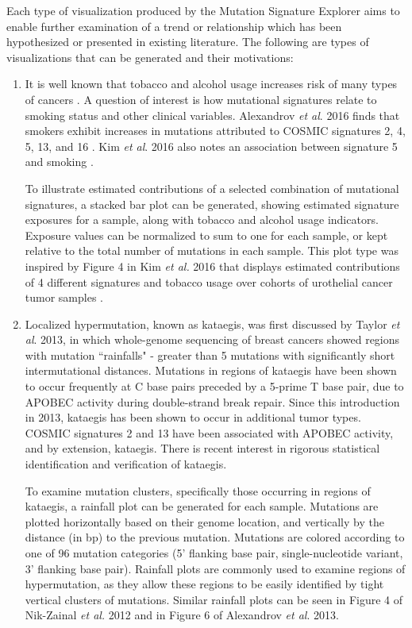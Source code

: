\documentclass[12pt, letterpaper]{article}
\begin{document}
Each type of visualization produced by the Mutation Signature Explorer aims to enable further examination of a trend or relationship which has been hypothesized or presented in existing literature.
The following are types of visualizations that can be generated and their motivations:
\begin{enumerate}
\item It is well known that tobacco and alcohol usage increases risk of many types of cancers \cite{doll1956lung,collaborative2002alcohol}. A question of interest is how mutational signatures relate to smoking status and other clinical variables. Alexandrov \textit{et al}. 2016 finds that smokers exhibit increases in mutations attributed to COSMIC signatures 2, 4, 5, 13, and 16 \cite{alexandrov2016mutational}. Kim \textit{et al}. 2016 also notes an association between signature 5 and smoking \cite{kim2016somatic}.

To illustrate estimated contributions of a selected combination of mutational signatures, a stacked bar plot can be generated, showing estimated signature exposures for a sample, along with tobacco and alcohol usage indicators.
Exposure values can be normalized to sum to one for each sample, or kept relative to the total number of mutations in each sample.
This plot type was inspired by Figure 4 in Kim \textit{et al.} 2016 that displays estimated contributions of 4 different signatures and tobacco usage over cohorts of urothelial cancer tumor samples \cite{kim2016somatic}.
    
\item Localized hypermutation, known as kataegis, was first discussed by Taylor \textit{et al}. 2013\cite{taylor2013dna}, in which whole-genome sequencing of breast cancers showed regions with mutation ``rainfalls" - greater than 5 mutations with significantly short intermutational distances. Mutations in regions of kataegis have been shown to occur frequently at C base pairs preceded by a 5-prime T base pair, due to APOBEC activity during double-strand break repair\cite{taylor2013dna}. Since this introduction in 2013, kataegis has been shown to occur in additional tumor types\cite{alexandrov2013signatures}. COSMIC signatures 2 and 13 have been associated with APOBEC activity, and by extension, kataegis\cite{alexandrov2013signatures}. There is recent interest in rigorous statistical identification and verification of kataegis\cite{yousif2018origins}.

To examine mutation clusters, specifically those occurring in regions of kataegis, a rainfall plot can be generated for each sample.
Mutations are plotted horizontally based on their genome location, and vertically by the distance (in bp) to the previous mutation.
Mutations are colored according to one of 96 mutation categories (5' flanking base pair, single-nucleotide variant, 3' flanking base pair).
Rainfall plots are commonly used to examine regions of hypermutation, as they allow these regions to be easily identified by tight vertical clusters of mutations. 
Similar rainfall plots can be seen in Figure 4 of Nik-Zainal \textit{et al.} 2012\cite{nik2012mutational} and in Figure 6 of Alexandrov \textit{et al}. 2013\cite{alexandrov2013signatures}.


\end{enumerate}
\end{document}
